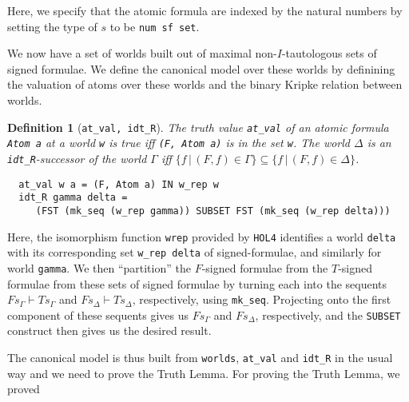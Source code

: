 \documentclass[a4paper]{article}
\newtheorem{definition}{Definition}
\newcommand{\hol}{\texttt{HOL4}}
\begin{document}
Here, we specify that the atomic formula are indexed by the natural
numbers by setting the type of $s$ to be \texttt{num sf set}.

We now have a set of worlds built out of maximal non-$I$-tautologous
sets of signed formulae. We define the canonical model over these
worlds by definining the valuation of atoms over these worlds and the
binary Kripke relation between worlds.  

\begin{definition}[\texttt{at\_val, idt\_R}]\label{at-val,idt-R}
  The truth value \texttt{at\_val} of an atomic formula \texttt{Atom
    a} at a world \texttt{w} is true iff \texttt{(F, Atom a)} is in
  the set \texttt{w}.
  The world $\Delta$ is an \texttt{idt\_R}-successor of the world
  $\Gamma$ iff
  $\{f \,|\, (F, f) \in \Gamma\} \subseteq \{f \,|\, (F, f) \in
  \Delta\}$.
\begin{verbatim}
  at_val w a = (F, Atom a) IN w_rep w
  idt_R gamma delta = 
     (FST (mk_seq (w_rep gamma)) SUBSET FST (mk_seq (w_rep delta)))
\end{verbatim}
\end{definition}

Here, the isomorphism function \texttt{wrep} provided by \hol{}
identifies a world \texttt{delta} with its corresponding
set \texttt{w\_rep delta} of signed-formulae, and similarly for world
\texttt{gamma}. We then ``partition'' the $F$-signed formulae from the
$T$-signed formulae from these
sets of signed formulae by turning each into the sequents
$Fs_{\Gamma} \vdash Ts_{\Gamma}$ and
$Fs_{\Delta} \vdash Ts_{\Delta}$, respectively, using \texttt{mk\_seq}.
Projecting onto the first component of these sequents gives us
$Fs_{\Gamma}$ and $Fs_{\Delta}$, respectively,
and the \texttt{SUBSET} construct then gives us the desired result.

The canonical model is thus built from \texttt{worlds},
\texttt{at\_val} and \texttt{idt\_R} in the usual way and we need to
prove the Truth Lemma.
For proving the Truth Lemma, we proved
\end{document}
